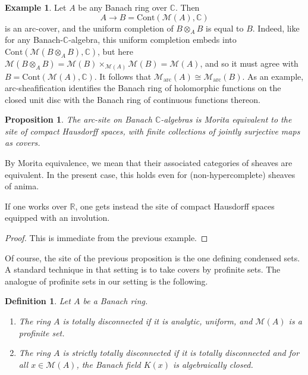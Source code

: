 \documentclass[11pt]{amsart}
\numberwithin{equation}{section}
\numberwithin{theorem}{section}
\newtheorem{proposition}[theorem]{Proposition}
\newtheorem{definition}[theorem]{Definition}
\theoremstyle{definition}
\newtheorem{example}[theorem]{Example}
\begin{document}
\begin{example} Let $A$ be any Banach ring over $\mathbb C$. Then
\[
A\to B=\mathrm{Cont}(\mathcal M(A),\mathbb C)
\]
is an arc-cover, and the uniform completion of $B\otimes_A B$ is equal to $B$. Indeed, like for any Banach-$\mathbb C$-algebra, this uniform completion embeds into $\mathrm{Cont}(\mathcal M(B\otimes_A B),\mathbb C)$, but here $\mathcal M(B\otimes_A B)=\mathcal M(B)\times_{\mathcal M(A)} \mathcal M(B) = \mathcal M(A)$, and so it must agree with $B=\mathrm{Cont}(\mathcal M(A),\mathbb C)$. It follows that $\mathcal M_{\mathrm{arc}}(A)\cong \mathcal M_{\mathrm{arc}}(B)$. As an example, arc-sheafification identifies the Banach ring of holomorphic functions on the closed unit disc with the Banach ring of continuous functions thereon.
\end{example}

\begin{proposition} The arc-site on Banach $\mathbb C$-algebras is Morita equivalent to the site of compact Hausdorff spaces, with finite collections of jointly surjective maps as covers.
\end{proposition}

By Morita equivalence, we mean that their associated categories of sheaves are equivalent. In the present case, this holds even for (non-hypercomplete) sheaves of anima.

If one works over $\mathbb R$, one gets instead the site of compact Hausdorff spaces equipped with an involution.

\begin{proof} This is immediate from the previous example.
\end{proof}

Of course, the site of the previous proposition is the one defining condensed sets. A standard technique in that setting is to take covers by profinite sets. The analogue of profinite sets in our setting is the following.

\begin{definition}\label{def:totallydisconnected} Let $A$ be a Banach ring.
\begin{enumerate}
\item[{\rm (i)}] The ring $A$ is totally disconnected if it is analytic, uniform, and $\mathcal M(A)$ is a profinite set.
\item[{\rm (ii)}] The ring $A$ is strictly totally disconnected if it is totally disconnected and for all $x\in \mathcal M(A)$, the Banach field $K(x)$ is algebraically closed.
\end{enumerate}
\end{definition}
\end{document}
